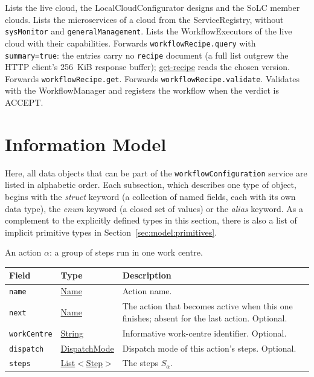 \documentclass[a4paper]{arrowhead}
\newcommand{\mref}[1]{{\textcolor{ArrowheadPurple}{\hyperref[sec:model:#1]{#1}}}}
\newcommand{\oref}[1]{{\textcolor{ArrowheadBlue}{\hyperref[sec:operations:#1]{#1}}}}
\newcommand{\pref}[1]{{\textcolor{ArrowheadGrey}{\hyperref[sec:model:primitives:#1]{#1}}}}
\begin{document}
Lists the live cloud, the LocalCloudConfigurator designs and the SoLC member clouds.
Lists the microservices of a cloud from the ServiceRegistry, without \texttt{sysMonitor} and \texttt{general\allowbreak{}Management}.
Lists the WorkflowExecutors of the live cloud with their capabilities.
Forwards \texttt{workflow\allowbreak{}Recipe.\allowbreak{}query} with \texttt{summary=true}: the entries carry no \texttt{recipe} document (a full list outgrew the HTTP client's 256~KiB response buffer); \oref{get-recipe} reads the chosen version.
Forwards \texttt{workflow\allowbreak{}Recipe.\allowbreak{}get}.
Forwards \texttt{workflow\allowbreak{}Recipe.\allowbreak{}validate}.
Validates with the WorkflowManager and registers the workflow when the verdict is ACCEPT.

\newpage
\section{Information Model}
\label{sec:model}
Here, all data objects that can be part of the \texttt{workflow\allowbreak{}Configuration} service are listed in alphabetic order. Each
subsection, which describes one type of object, begins with the \textit{struct} keyword (a collection of named fields,
each with its own data type), the \textit{enum} keyword (a closed set of values) or the \textit{alias} keyword. As a
complement to the explicitly defined types in this section, there is also a list of implicit primitive types in
Section~\ref{sec:model:primitives}.

An action $\alpha$: a group of steps run in one work centre.

{\small
\begin{longtable}{|p{3.9cm}|p{4.4cm}|p{7.5cm}|}

\hline
\rowcolor{gray!33} Field & Type & Description \\ \hline
\endhead
\texttt{name} & \pref{Name} & Action name. \\ \hline
\texttt{next} & \pref{Name} & The action that becomes active when this one finishes; absent for the last action. Optional. \\ \hline
\texttt{workCentre} & \pref{String} & Informative work-centre identifier. Optional. \\ \hline
\texttt{dispatch} & \mref{DispatchMode} & Dispatch mode of this action's steps. Optional. \\ \hline
\texttt{steps} & \pref{List}$<$\mref{Step}$>$ & The steps $S_\alpha$. \\ \hline
\end{longtable}
}
\end{document}
